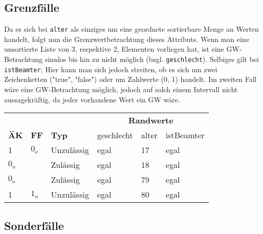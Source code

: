 \documentclass{article}
\begin{document}
\begin{enumerate}[label=\alph*.]
            \newpage

            \subsection*{Grenzfälle}

            Da es sich bei \texttt{alter} als einziges um eine geordnete sortierbare Menge an Werten handelt, folgt nun die Grenzwertbetrachtung dieses Attributs.
            Wenn man eine unsortierte Liste von 3, respektive 2, Elementen vorliegen hat, ist eine GW-Betrachtung sinnlos bis hin zu nicht möglich (bzgl. \texttt{geschlecht}).
            Selbiges gilt bei \texttt{istBeamter}; Hier kann man sich jedoch streiten, ob es sich um zwei Zeichenketten ("true", "false") oder um Zahlwerte (0, 1) handelt.
            Im zweiten Fall wäre eine GW-Betrachtung möglich, jedoch auf solch einem Intervall nicht aussagekräftig, da jeder vorhandene Wert ein GW wäre.\\

            \begin{tabularx}{\textwidth}{|p{3em}|p{3em}|X|p{5em}|p{7em}|p{5em}|}
                \hline
                \cellcolor[gray]{0.75} & \cellcolor[gray]{0.75} & \cellcolor[gray]{0.75} & \multicolumn{3}{c|}{\cellcolor[gray]{0.75} \textbf{Randwerte}}\\
                \multirow{-2}{*}{\cellcolor[gray]{0.75} \textbf{ÄK}} & \multirow{-2}{*}{\cellcolor[gray]{0.75} \textbf{FF}} & \multirow{-2}{*}{\cellcolor[gray]{0.75} \textbf{Typ}} & \cellcolor[gray]{0.75} geschlecht & \cellcolor[gray]{0.75} alter & \cellcolor[gray]{0.75} istBeamter\\\hline  
                1 & $0_o$ & Unzulässig & egal & 17 & egal\\\hline
                $0_u$ & & Zulässig & egal & 18 & egal\\\hline
                $0_o$ & & Zulässig & egal & 79 & egal\\\hline
                1 & $1_u$ & Unzulässig & egal & 80 & egal\\\hline
            \end{tabularx}

            \subsection*{Sonderfälle}


\end{enumerate}
\end{document}
